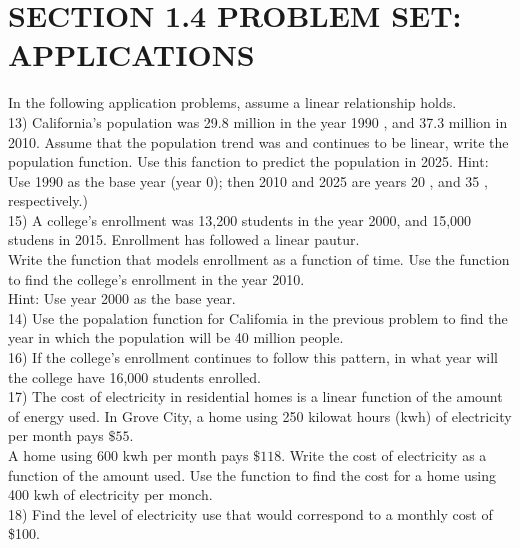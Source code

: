 \section*{SECTION 1.4 PROBLEM SET: APPLICATIONS}
In the following application problems, assume a linear relationship holds.\\
13) California's population was 29.8 million in the year 1990 , and 37.3 million in 2010. Assume that the population trend was and continues to be linear, write the population function. Use this fanction to predict the population in 2025. Hint: Use 1990 as the base year (year 0); then 2010 and 2025 are years 20 , and 35 , respectively.)\\
15) A college's enrollment was 13,200 students in the year 2000, and 15,000 studens in 2015. Enrollment has followed a linear pautur.\\
Write the function that models enrollment as a function of time. Use the function to find the college's enrollment in the year 2010.\\
Hint: Use year 2000 as the base year.\\
14) Use the popalation function for Califomia in the previous problem to find the year in which the population will be 40 million people.\\
16) If the college's enrollment continues to follow this pattern, in what year will the college have 16,000 students enrolled.\\
17) The cost of electricity in residential homes is a linear function of the amount of energy used. In Grove City, a home using 250 kilowat hours (kwh) of electricity per month pays $\$ 55$.\\
A home using 600 kwh per month pays $\$ 118$. Write the cost of electricity as a function of the amount used. Use the function to find the cost for a home using 400 kwh of electricity per monch.\\
18) Find the level of electricity use that would correspond to a monthly cost of \$100.

